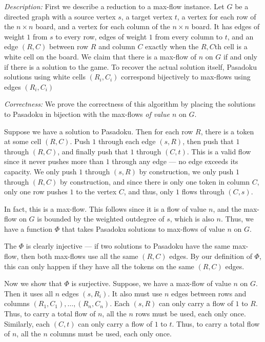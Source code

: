 \documentclass[12 pt, letterpaper]{hmcpset}
\begin{document}
\begin{solution}
	\emph{Description:} First we describe a reduction to a max-flow instance. Let $G$ be a directed graph with a source vertex $s$, a target vertex $t$, a vertex for each row of the $n \times n$ board, and a vertex for each column of the $n \times n$ board. It has edges of weight $1$ from $s$ to every row, edges of weight $1$ from every column to $t$, and an edge $(R, C)$ between row $R$ and column $C$ exactly when the $R, C$th cell is a white cell on the board. We claim that there is a max-flow of $n$ on $G$ if and only if there is a solution to the game. To recover the actual solution itself, Pasadoku solutions using white cells $(R_{i}, C_{i})$ correspond bijectively to max-flows using edges $(R_{i}, C_{i})$

	\emph{Correctness:} We prove the correctness of this algorithm by placing the solutions to Pasadoku in bijection with the max-flows \emph{of value $n$} on $G$. 

	Suppose we have a solution to Pasadoku. Then for each row $R$, there is a token at some cell $(R, C)$. Push $1$ through each edge $(s, R)$, then push that $1$ through $(R, C)$, and finally push that $1$ through $(C, t)$. This is a valid flow since it never pushes more than $1$ through any edge --- no edge exceeds its capacity. We only push $1$ through $(s, R)$ by construction, we only push $1$ through $(R, C)$ by construction, and since there is only one token in column $C$, only one row pushes $1$ to the vertex $C$, and thus, only $1$ flows through $(C, s)$. 

	In fact, this is a max-flow. This follows since it is a flow of value $n$, and the max-flow on $G$ is bounded by the weighted outdegree of $s$, which is also $n$. Thus, we have a function $\Phi$ that takes Pasadoku solutions to max-flows of value $n$ on $G$. 

	The $\Phi$ is clearly injective --- if two solutions to Pasadoku have the same max-flow, then both max-flows use all the same $(R, C)$ edges. By our definition of $\Phi$, this can only happen if they have all the tokens on the same $(R, C)$ edges.

	Now we show that $\Phi$ is surjective. Suppose, we have a max-flow of value $n$ on $G$. Then it uses all $n$ edges $(s, R_{i})$. It also must use $n$ edges between rows and columns $(R_{1}, C_{1}), \dots, (R_{n}, C_{n})$. Each $(s, R)$ can only carry a flow of $1$ to $R$. Thus, to carry a total flow of $n$, all the $n$ rows must be used, each only once. Similarly, each $(C, t)$ can only carry a flow of $1$ to $t$. Thus, to carry a total flow of $n$, all the $n$ columns must be used, each only once.


\end{solution}
\end{document}
